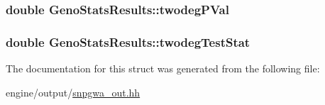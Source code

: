 \label{structGenoStatsResults_a2aa9578515d50fb8bcef93198c92d63e}
\hypertarget{structGenoStatsResults_a5de1f45e02308c33f2030392d55a664d}{
\subsubsection[{twodegPVal}]{\setlength{\rightskip}{0pt plus 5cm}double {\bf GenoStatsResults::twodegPVal}}}
\label{structGenoStatsResults_a5de1f45e02308c33f2030392d55a664d}
\hypertarget{structGenoStatsResults_a8939e18575bccc8154ee9dd919ce8b90}{
\subsubsection[{twodegTestStat}]{\setlength{\rightskip}{0pt plus 5cm}double {\bf GenoStatsResults::twodegTestStat}}}
\label{structGenoStatsResults_a8939e18575bccc8154ee9dd919ce8b90}


The documentation for this struct was generated from the following file:\begin{DoxyCompactItemize}
\item 
engine/output/\hyperlink{snpgwa__out_8hh}{snpgwa\_\-out.hh}\end{DoxyCompactItemize}
